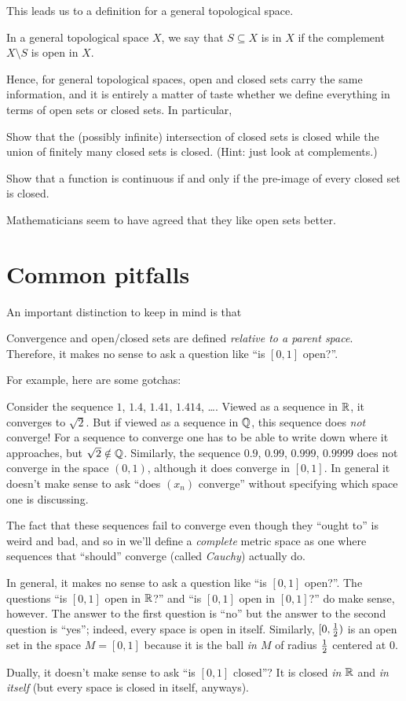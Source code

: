 This leads us to a definition for a general topological space.
\begin{definition}
	In a general topological space $X$, we say that $S \subseteq X$ is
	 in $X$ if the complement $X \setminus S$ is open in $X$.
\end{definition}
Hence, for general topological spaces, open and closed sets carry the same information,
and it is entirely a matter of taste whether we define everything in terms
of open sets or closed sets.
In particular,
\begin{ques}
	Show that the (possibly infinite) intersection of closed sets is closed
	while the union of finitely many closed sets is closed.
	(Hint: just look at complements.)
\end{ques}
\begin{ques}
	Show that a function is continuous if and only if the pre-image
	of every closed set is closed.
\end{ques}
Mathematicians seem to have agreed that they like open sets better.

\section{Common pitfalls}
An important distinction to keep in mind is that
\begin{moral}
	Convergence and open/closed sets are defined \emph{relative to a parent space}.
	Therefore, it makes no sense to ask a question like ``is $[0,1]$ open?''.
\end{moral}
For example, here are some gotchas:
\begin{itemize}
	\ii Consider the sequence $1$, $1.4$, $1.41$, $1.414$, \dots.
	Viewed as a sequence in $\mathbb R$, it converges to $\sqrt 2$.
	But if viewed as a sequence in $\mathbb Q$, this sequence does \emph{not} converge!
	For a sequence to converge one has to be able to write down where it approaches,
	but $\sqrt 2 \notin \mathbb Q$.
	Similarly, the sequence $0.9$, $0.99$, $0.999$, $0.9999$ does not converge in the space $(0,1)$,
	although it does converge in $[0,1]$.
	In general it doesn't make sense to ask
	``does $(x_n)$ converge'' without specifying which space one is discussing.

	The fact that these sequences fail to converge even though they ``ought to'' is weird and bad,
	and so in  we'll define a \emph{complete} metric space as one where sequences
	that ``should'' converge (called \emph{Cauchy}) actually do.

	\ii In general, it makes no sense to ask a question like ``is $[0,1]$ open?''.
	The questions ``is $[0,1]$ open in $\mathbb R$?''
	and ``is $[0,1]$ open in $[0,1]$?'' do make sense, however.
	The answer to the first question is ``no''
	but the answer to the second question is ``yes'';
	indeed, every space is open in itself.
	Similarly, $[0, \frac{1}{2})$ is an open set %
	in the space $M = [0,1]$
	because it is the ball \emph{in $M$} of radius $\frac{1}{2}$ centered at $0$.

	\ii Dually, it doesn't make sense to ask ``is $[0,1]$ closed''?
	It is closed \emph{in $\mathbb R$} and \emph{in itself} (but every space is closed in itself, anyways).
\end{itemize}

